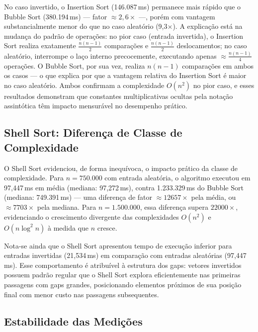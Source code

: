 \documentclass[12pt]{article}
\newcommand{\num}[1]{#1}
\begin{document}
No caso invertido, o Insertion Sort (146.087\,ms) permanece
mais rápido que o Bubble Sort (380.194\,ms) — fator
$\approx 2{,}6\times$ —, porém com vantagem substancialmente
menor do que no caso aleatório (9,3×). A explicação está na
mudança do padrão de operações: no pior caso (entrada
invertida), o Insertion Sort realiza exatamente
$\frac{n(n-1)}{2}$ comparações e $\frac{n(n-1)}{2}$
deslocamentos; no caso aleatório, interrompe o laço interno
precocemente, executando apenas $\approx\frac{n(n-1)}{4}$
operações. O Bubble Sort, por sua vez, realiza $n(n-1)$
comparações em ambos os casos — o que explica por que a
vantagem relativa do Insertion Sort é maior no caso
aleatório. Ambos confirmam a complexidade $O(n^2)$ no pior
caso, e esses resultados demonstram que constantes
multiplicativas ocultas pela notação assintótica têm impacto
mensurável no desempenho prático.

\subsection{Shell Sort: Diferença de Classe de Complexidade}

O Shell Sort evidenciou, de forma inequívoca, o impacto prático
da classe de complexidade. Para $n = 750.000$ com entrada
aleatória, o algoritmo executou em 97,447\,ms em média
(mediana: 97,272\,ms), contra 1.233.329\,ms do Bubble Sort
(mediana: 749.391\,ms) — uma diferença de fator
$\approx \num{12657}\times$ pela média, ou
$\approx \num{7703}\times$ pela mediana. Para
$n = 1.500.000$, essa diferença supera $\num{22000}\times$,
evidenciando o crescimento divergente das complexidades
$O(n^2)$ e $O(n \log^2 n)$ à medida que $n$ cresce.

Nota-se ainda que o Shell Sort apresentou tempo de execução
inferior para entradas invertidas (21,534\,ms)
em comparação com entradas aleatórias (97,447\,ms).
Esse comportamento é atribuível à estrutura dos gaps: vetores
invertidos possuem padrão regular que o Shell Sort explora
eficientemente nas primeiras passagens com gaps grandes,
posicionando elementos próximos de sua posição final com
menor custo nas passagens subsequentes.

\subsection{Estabilidade das Medições}
\end{document}

